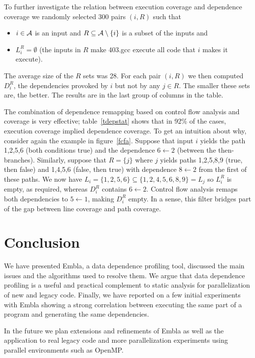 \documentclass[times, 10pt,twocolumn]{article}
\begin{document}
To further investigate the relation between execution coverage and 
dependence coverage we randomly selected 300 pairs $(i,R)$  such that 
\begin{itemize}
\item %
$i\in \cal A$ is an input and $R \subseteq {\cal A} \setminus \{i\}$ is a 
subset of the inputs and
\item %
$L_i^R = \emptyset$ (the inputs in $R$ 
make 403.gcc execute all code that $i$ makes it execute). 
\end{itemize}
The average size of the $R$ sets was 28. For each pair 
$(i,R)$ we then computed $D_i^R$, the dependencies provoked by $i$ but 
not by any $j\in R$. The smaller these sets are, the better. The results are in the 
last group of columns in the table. %

The combination of dependence remapping based on control flow analysis
and coverage is very effective; table~\ref{tdepstat} shows that in 92\% of
the cases, execution coverage implied dependence coverage. To get an 
intuition about why, consider again the example in figure~\ref{fcfa}.
Suppose that input $i$ yields the path 1,2,5,6 (both conditions true)
and the dependence $6 \leftarrow 2$
(between the then-branches). Similarly, suppose that $R=\{j\}$ where $j$ 
yields paths 1,2,5,8,9 (true, then false) and 1,4,5,6 (false, then true)
with dependence $8 \leftarrow 2$ from the first of these paths. We now have
$L_i = \{1,2,5,6\} \subseteq \{1,2,4,5,6,8,9\} = L_j$ so $L_i^R$ is empty, 
as required, whereas $D_i^R$ contains $6 \leftarrow 2$. Control flow analysis
remaps both dependencies to $5 \leftarrow 1$, making $D_i^R$ empty. In a sense,
this filter bridges part of the gap between line coverage and path coverage.

\section{Conclusion}

We have presented Embla, a data dependence profiling tool, discussed
the main issues and the algorithms used to resolve them. We argue that
data dependence profiling is a useful and practical complement to
static analysis for parallelization of new and legacy code. Finally,
we have reported on a few initial experiments with Embla showing a
strong correlation between executing the same part of a program and
generating the same dependencies.

In the future we plan extensions and refinements of Embla as well as
the application to real legacy code and 
more parallelization experiments using parallel environments such as
OpenMP.




\end{document}
